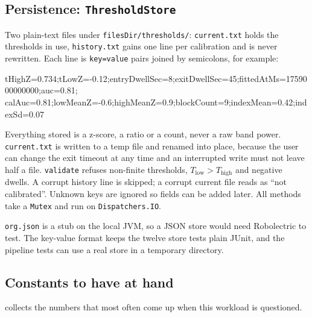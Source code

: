 \documentclass[10pt,a4paper]{article}
\newcommand{\code}[1]{\texttt{#1}}                  %
\newcommand{\Thigh}{T_{\mathrm{high}}}
\newcommand{\Tlow}{T_{\mathrm{low}}}
\begin{document}
\subsection{Persistence: \code{ThresholdStore}}

Two plain-text files under \code{filesDir/thresholds/}: \code{current.txt} holds the thresholds
in use, \code{history.txt} gains one line per calibration and is never rewritten. Each line is
\code{key=value} pairs joined by semicolons, for example:

\begin{center}\small\ttfamily
tHighZ=0.734;tLowZ=-0.12;entryDwellSec=8;exitDwellSec=45;fittedAtMs=1759000000000;auc=0.81;\\
calAuc=0.81;lowMeanZ=-0.6;highMeanZ=0.9;blockCount=9;indexMean=0.42;indexSd=0.07
\end{center}

Everything stored is a z-score, a ratio or a count, never a raw band power. \code{current.txt}
is written to a temp file and renamed into place, because the user can change the exit timeout at
any time and an interrupted write must not leave half a file. \code{validate} refuses non-finite
thresholds, $\Tlow > \Thigh$ and negative dwells. A corrupt history line is skipped; a corrupt
current file reads as ``not calibrated''. Unknown keys are ignored so fields can be added later.
All methods take a \code{Mutex} and run on \code{Dispatchers.IO}.

\begin{why}
\code{org.json} is a stub on the local JVM, so a JSON store would need Robolectric to test. The
key-value format keeps the twelve store tests plain JUnit, and the pipeline tests can use a real
store in a temporary directory.
\end{why}

\subsection{Constants to have at hand}

 collects the numbers that most often come up when this workload is questioned.
\end{document}
